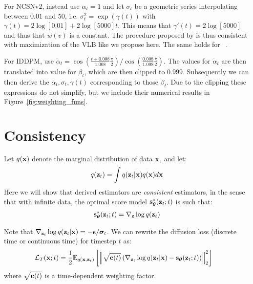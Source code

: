 \documentclass{article}
\begin{document}
For NCSNv2, \cite{song2020improved} instead use $\alpha_t = 1$ and let $\sigma_{t}$ be a geometric series interpolating between $0.01$ and $50$, i.e. $\sigma^{2}_t = \exp(\gamma(t))$ with $\gamma(t)=2\log[0.01] + 2\log[5000]t$. This means that $\gamma'(t)=2\log[5000]$ and thus that $w(v)$ is a constant. The procedure proposed by \cite{song2020improved} is thus consistent with maximization of the VLB like we propose here. The same holds for ~\citep{song2019generative}.

For IDDPM, \cite{nichol2021improved} use $\tilde{\alpha}_{t} = \cos(\frac{t+0.008}{1.008}\frac{\pi}{2})/\cos(\frac{0.008}{1.008}\frac{\pi}{2})$. The values for $\tilde{\alpha}_{t}$ are then translated into value for $\beta_t$, which are then clipped to $0.999$. Subsequently we can then derive the $\alpha_{t},\sigma_t,\gamma(t)$ corresponding to those $\beta_t$. Due to the clipping these expressions do not simplify, but we include their numerical results in Figure~\ref{fig:weighting_funs}.


\section{Consistency}
\label{sec:dsm}

Let $q({\mathbf{x}})$ denote the marginal distribution of data ${\mathbf{x}}$, and let:
\begin{align}
    q({\mathbf{z}}_t) = \int q({\mathbf{z}}_t|{\mathbf{x}}) q({\mathbf{x}}) d{\mathbf{x}}
\end{align}
Here we will show that derived estimators are \emph{consistent} estimators, in the sense that with infinite data, the optimal score model $\mathbf{s}_{{\boldsymbol{\theta}}}^*({\mathbf{z}}_t;t)$ is such that:
\begin{align}
    \mathbf{s}_{{\boldsymbol{\theta}}}^*({\mathbf{z}}_t;t) = \nabla_{{\mathbf{z}}} \log q({\mathbf{z}}_t)
\end{align}

Note that $\nabla_{{\mathbf{z}}_t} \log q({\mathbf{z}}_t|{\mathbf{x}}) = -{\boldsymbol{\epsilon}}/{\boldsymbol{\sigma}}_t$. We can rewrite the diffusion loss (discrete time or continuous time) for timestep $t$ as:
\begin{align}
\mathcal{L}_T({\mathbf{x}}; t) &=
\frac{1}{2} 
\mathbb{E}_{q({\mathbf{x}},{\mathbf{z}}_t)} \left[
\left\lVert
\sqrt{{\mathbf{c}}(t)}
    \left(\nabla_{{\mathbf{z}}_t} \log q({\mathbf{z}}_t|{\mathbf{x}}) - \mathbf{s}_{{\boldsymbol{\theta}}}({\mathbf{z}}_t; t)\right)
\right\rVert_2^2
\right]
\end{align}
where $\sqrt{{\mathbf{c}}(t)}$ is a time-dependent weighting factor. 
\end{document}
